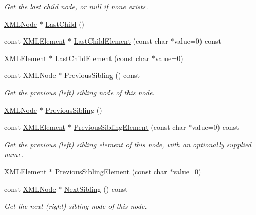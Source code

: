 \begin{DoxyCompactItemize}
\begin{DoxyCompactList}\small\item\em Get the last child node, or null if none exists. \end{DoxyCompactList}\item 
\hyperlink{classtinyxml2_1_1_x_m_l_node}{X\-M\-L\-Node} $\ast$ \hyperlink{classtinyxml2_1_1_x_m_l_node_ad7552c8cb1dc0cb6f3bdc14a9d115dbf}{Last\-Child} ()
\item 
const \hyperlink{classtinyxml2_1_1_x_m_l_element}{X\-M\-L\-Element} $\ast$ \hyperlink{classtinyxml2_1_1_x_m_l_node_a1a46cc01ece2216acf1e6294d1aff79d}{Last\-Child\-Element} (const char $\ast$value=0) const 
\item 
\hyperlink{classtinyxml2_1_1_x_m_l_element}{X\-M\-L\-Element} $\ast$ \hyperlink{classtinyxml2_1_1_x_m_l_node_a125423acf3170b130634638c5afc0639}{Last\-Child\-Element} (const char $\ast$value=0)
\item 
const \hyperlink{classtinyxml2_1_1_x_m_l_node}{X\-M\-L\-Node} $\ast$ \hyperlink{classtinyxml2_1_1_x_m_l_node_a4cb1bf63e9de55129d21a7be60685fd4}{Previous\-Sibling} () const 
\begin{DoxyCompactList}\small\item\em Get the previous (left) sibling node of this node. \end{DoxyCompactList}\item 
\hyperlink{classtinyxml2_1_1_x_m_l_node}{X\-M\-L\-Node} $\ast$ \hyperlink{classtinyxml2_1_1_x_m_l_node_ae760e5e7e766df1d2cf3bb4a847876d6}{Previous\-Sibling} ()
\item 
const \hyperlink{classtinyxml2_1_1_x_m_l_element}{X\-M\-L\-Element} $\ast$ \hyperlink{classtinyxml2_1_1_x_m_l_node_a573b2559c41dce244d893d610fbe0bd9}{Previous\-Sibling\-Element} (const char $\ast$value=0) const 
\begin{DoxyCompactList}\small\item\em Get the previous (left) sibling element of this node, with an optionally supplied name. \end{DoxyCompactList}\item 
\hyperlink{classtinyxml2_1_1_x_m_l_element}{X\-M\-L\-Element} $\ast$ \hyperlink{classtinyxml2_1_1_x_m_l_node_ae9177fdc49cb89879f333581d5f734f1}{Previous\-Sibling\-Element} (const char $\ast$value=0)
\item 
const \hyperlink{classtinyxml2_1_1_x_m_l_node}{X\-M\-L\-Node} $\ast$ \hyperlink{classtinyxml2_1_1_x_m_l_node_abba1df37581d89dccc45acdc55750ba2}{Next\-Sibling} () const 
\begin{DoxyCompactList}\small\item\em Get the next (right) sibling node of this node. \end{DoxyCompactList}\item 

\end{DoxyCompactItemize}

